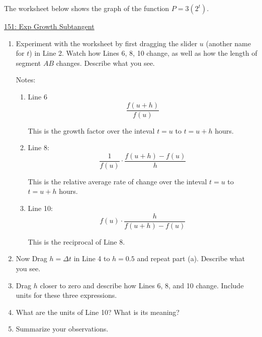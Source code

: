 \documentclass{ximera}
\begin{document}
\begin{exploration} \label{EKDFeredfM}
The worksheet below shows the graph of the function $P=3(2^t)$. 

\href{https://www.desmos.com/calculator/zu0f4jnh4a}{151: Exp Growth Subtangent}

 
\begin{onlineOnly}
    \begin{center}
\end{center}
\end{onlineOnly}


\begin{enumerate}
\item Experiment with the worksheet by first dragging the slider $u$ (another name for $t$) in Line 2. Watch how Lines 6, 8, 10 change, as well as how the length of segment $AB$ changes. Describe what you see.

Notes:

\begin{enumerate}
\item Line 6
\[
\frac{f(u+h)}{f(u)}
\]

This is the growth factor over the inteval $t=u$ to $t=u+h$ hours.

\item Line 8: 
\[
    \frac{1}{f(u)}\cdot \frac{f(u+h)-f(u)}{h}
\]

This is the relative average rate of change over the inteval $t=u$ to $t=u+h$ hours.

\item Line 10:
\[
    f(u) \cdot \frac{h}{f(u+h)-f(u)}
\]

This is the reciprocal of Line 8.
\end{enumerate}


\item Now Drag $h=\Delta t$ in Line 4 to $h=0.5$ and repeat part (a). Describe what you see.

\item Drag $h$ closer to zero and describe how Lines 6, 8, and 10 change. Include units for these three expressions.

\item What are the units of Line 10? What is its meaning?

\item Summarize your observations.

\end{enumerate}
\end{exploration}
\end{document}
